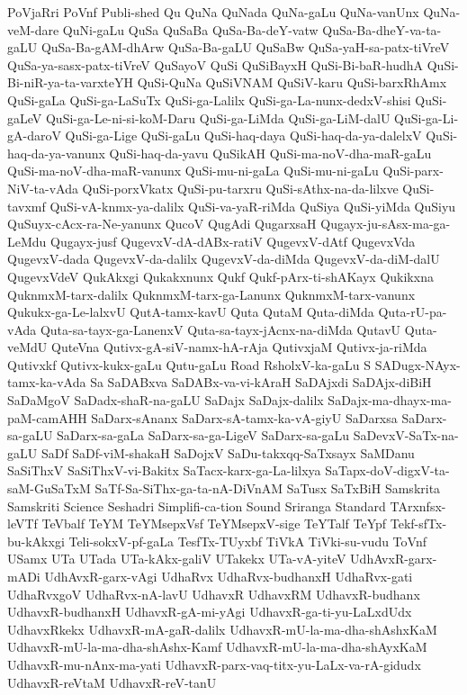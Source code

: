 {PoVjaRri
PoVnf
Publi-shed
Qu
QuNa
QuNada
QuNa-gaLu
QuNa-vanUnx
QuNa-veM-dare
QuNi-gaLu
QuSa
QuSaBa
QuSa-Ba-deY-vatw
QuSa-Ba-dheY-va-ta-gaLU
QuSa-Ba-gAM-dhArw
QuSa-Ba-gaLU
QuSaBw
QuSa-yaH-sa-patx-tiVreV
QuSa-ya-sasx-patx-tiVreV
QuSayoV
QuSi
QuSiBayxH
QuSi-Bi-baR-hudhA
QuSi-Bi-niR-ya-ta-varxteYH
QuSi-QuNa
QuSiVNAM
QuSiV-karu
QuSi-barxRhAmx
QuSi-gaLa
QuSi-ga-LaSuTx
QuSi-ga-Lalilx
QuSi-ga-La-nunx-dedxV-shisi
QuSi-gaLeV
QuSi-ga-Le-ni-si-koM-Daru
QuSi-ga-LiMda
QuSi-ga-LiM-dalU
QuSi-ga-Li-gA-daroV
QuSi-ga-Lige
QuSi-gaLu
QuSi-haq-daya
QuSi-haq-da-ya-dalelxV
QuSi-haq-da-ya-vanunx
QuSi-haq-da-yavu
QuSikAH
QuSi-ma-noV-dha-maR-gaLu
QuSi-ma-noV-dha-maR-vanunx
QuSi-mu-ni-gaLa
QuSi-mu-ni-gaLu
QuSi-parx-NiV-ta-vAda
QuSi-porxVkatx
QuSi-pu-tarxru
QuSi-sAthx-na-da-lilxve
QuSi-tavxmf
QuSi-vA-knmx-ya-dalilx
QuSi-va-yaR-riMda
QuSiya
QuSi-yiMda
QuSiyu
QuSuyx-cAcx-ra-Ne-yanunx
QucoV
QugAdi
QugarxsaH
Qugayx-ju-sAsx-ma-ga-LeMdu
Qugayx-jusf
QugevxV-dA-dABx-ratiV
QugevxV-dAtf
QugevxVda
QugevxV-dada
QugevxV-da-dalilx
QugevxV-da-diMda
QugevxV-da-diM-dalU
QugevxVdeV
QukAkxgi
Qukakxnunx
Qukf
Qukf-pArx-ti-shAKayx
Qukikxna
QuknmxM-tarx-dalilx
QuknmxM-tarx-ga-Lanunx
QuknmxM-tarx-vanunx
Qukukx-ga-Le-lalxvU
QutA-tamx-kavU
Quta
QutaM
Quta-diMda
Quta-rU-pa-vAda
Quta-sa-tayx-ga-LanenxV
Quta-sa-tayx-jAcnx-na-diMda
QutavU
Quta-veMdU
QuteVna
Qutivx-gA-siV-namx-hA-rAja
QutivxjaM
Qutivx-ja-riMda
Qutivxkf
Qutivx-kukx-gaLu
Qutu-gaLu
Road
RsholxV-ka-gaLu
S
SADugx-NAyx-tamx-ka-vAda
Sa
SaDABxva
SaDABx-va-vi-kAraH
SaDAjxdi
SaDAjx-diBiH
SaDaMgoV
SaDadx-shaR-na-gaLU
SaDajx
SaDajx-dalilx
SaDajx-ma-dhayx-ma-paM-camAHH
SaDarx-sAnanx
SaDarx-sA-tamx-ka-vA-giyU
SaDarxsa
SaDarx-sa-gaLU
SaDarx-sa-gaLa
SaDarx-sa-ga-LigeV
SaDarx-sa-gaLu
SaDevxV-SaTx-na-gaLU
SaDf
SaDf-viM-shakaH
SaDojxV
SaDu-takxqq-SaTxsayx
SaMDanu
SaSiThxV
SaSiThxV-vi-Bakitx
SaTacx-karx-ga-La-lilxya
SaTapx-doV-digxV-ta-saM-GuSaTxM
SaTf-Sa-SiThx-ga-ta-nA-DiVnAM
SaTusx
SaTxBiH
Samskrita
Samskriti
Science
Seshadri
Simplifi-ca-tion
Sound
Sriranga
Standard
TArxnfsx-leVTf
TeVbalf
TeYM
TeYMsepxVsf
TeYMsepxV-sige
TeYTalf
TeYpf
Tekf-sfTx-bu-kAkxgi
Teli-sokxV-pf-gaLa
TesfTx-TUyxbf
TiVkA
TiVki-su-vudu
ToVnf
USamx
UTa
UTada
UTa-kAkx-galiV
UTakekx
UTa-vA-yiteV
UdhAvxR-garx-mADi
UdhAvxR-garx-vAgi
UdhaRvx
UdhaRvx-budhanxH
UdhaRvx-gati
UdhaRvxgoV
UdhaRvx-nA-lavU
UdhavxR
UdhavxRM
UdhavxR-budhanx
UdhavxR-budhanxH
UdhavxR-gA-mi-yAgi
UdhavxR-ga-ti-yu-LaLxdUdx
UdhavxRkekx
UdhavxR-mA-gaR-dalilx
UdhavxR-mU-la-ma-dha-shAshxKaM
UdhavxR-mU-la-ma-dha-shAshx-Kamf
UdhavxR-mU-la-ma-dha-shAyxKaM
UdhavxR-mu-nAnx-ma-yati
UdhavxR-parx-vaq-titx-yu-LaLx-va-rA-gidudx
UdhavxR-reVtaM
UdhavxR-reV-tanU
}
